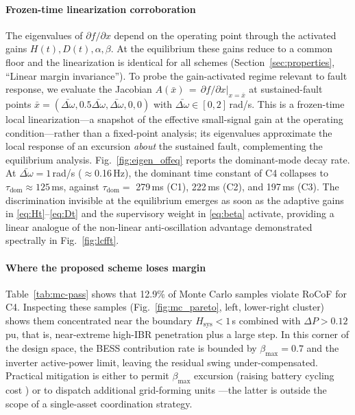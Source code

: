 \documentclass[journal]{IEEEtran}
\begin{document}
\paragraph*{Frozen-time linearization corroboration}
The eigenvalues of $\partial f/\partial x$ depend on the operating
point through the activated gains $H(t),D(t),\alpha,\beta$. At the
equilibrium these gains reduce to a common floor and the linearization
is identical for all schemes (Section~\ref{sec:properties}, ``Linear
margin invariance''). To probe the gain-activated regime relevant to
fault response, we evaluate the Jacobian
$A(\bar x)\,{=}\,\partial f/\partial x\big|_{x=\bar x}$ at sustained-fault
points $\bar x = (\bar{\Delta\omega},0.5\bar{\Delta\omega},\bar{\Delta\omega},0,0)$
with $\bar{\Delta\omega}\in[0,2]\,$rad/s. This is a frozen-time
local linearization---a snapshot of the effective small-signal gain
at the operating condition---rather than a fixed-point analysis;
its eigenvalues approximate the local response of an excursion
\emph{about} the sustained fault, complementing the equilibrium
analysis. Fig.~\ref{fig:eigen_offeq} reports the dominant-mode decay
rate. At $\bar{\Delta\omega}=1\,$rad/s ($\approx$0.16\,Hz), the
dominant time constant of C4 collapses to
$\tau_\mathrm{dom}\approx 125\,$ms, against
$\tau_\mathrm{dom}=$ 279\,ms (C1), 222\,ms (C2), and 197\,ms (C3).
The discrimination invisible at the equilibrium emerges as soon as
the adaptive gains in \eqref{eq:Ht}--\eqref{eq:Dt} and the
supervisory weight in \eqref{eq:beta} activate, providing a linear
analogue of the non-linear anti-oscillation advantage demonstrated
spectrally in Fig.~\ref{fig:lcfft}.

\paragraph*{Where the proposed scheme loses margin}
\label{sec:discussion-margin}
Table~\ref{tab:mc-pass} shows that 12.9\% of Monte Carlo samples
violate RoCoF for C4. Inspecting these samples
(Fig.~\ref{fig:mc_pareto}, left, lower-right cluster) shows them
concentrated near the boundary $H_\mathrm{sys}<1\,$s combined with
$\Delta P>0.12\,$pu, that is, near-extreme high-IBR penetration plus
a large step. In this corner of the design space, the BESS
contribution rate is bounded by $\beta_\mathrm{max}=0.7$ and the
inverter active-power limit, leaving the residual swing
under-compensated. Practical mitigation is either to permit
$\beta_\mathrm{max}$ excursion (raising battery cycling cost
\cite{wang2024hybrid,jiang2020droop}) or to dispatch additional
grid-forming units \cite{khan2024gridforming,shi2025comparative}---the
latter is outside the scope of a single-asset coordination strategy.
\end{document}

